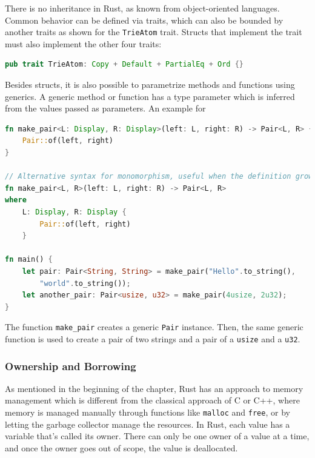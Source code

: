 \documentclass{article}
\begin{document}
There is no inheritance in Rust, as known from object-oriented languages. Common behavior can be defined via traits, which can also be bounded by another traits as shown for the \lstinline{TrieAtom} trait. Structs that implement the trait must also implement the other four traits:
\begin{lstlisting}[language=Rust, style=boxed, caption=An example trait from the \textit{trying} crate which we evaluate the approach on, label=lst:trying-trait-bounding]
pub trait TrieAtom: Copy + Default + PartialEq + Ord {}
\end{lstlisting}

Besides structs, it is also possible to parametrize methods and functions using generics. A generic method or function has a type parameter which is inferred from the values passed as parameters. An example for
\begin{lstlisting}[language=Rust, style=boxed, caption=Variants of defining a generic function, label=lst:function-monomorphization]
fn make_pair<L: Display, R: Display>(left: L, right: R) -> Pair<L, R> {
    Pair::of(left, right)
}

// Alternative syntax for monomorphism, useful when the definition grows large
fn make_pair<L, R>(left: L, right: R) -> Pair<L, R>
where
    L: Display, R: Display {
        Pair::of(left, right)
    }

fn main() {
    let pair: Pair<String, String> = make_pair("Hello".to_string(),
        "world".to_string());
    let another_pair: Pair<usize, u32> = make_pair(4usize, 2u32);
}
\end{lstlisting}

The function \lstinline{make_pair} creates a generic \lstinline{Pair} instance. Then, the same generic function is used to create a pair of two strings and a pair of a \lstinline{usize} and a \lstinline{u32}.

\subsubsection{Ownership and Borrowing}
As mentioned in the beginning of the chapter, Rust has an approach to memory management which is different from the classical approach of C or C++, where memory is managed manually through functions like \lstinline{malloc} and \lstinline{free}, or by letting the garbage collector manage the resources. In Rust, each value has a variable that's called its owner. There can only be one owner of a value at a time, and once the owner goes out of scope, the value is deallocated.
\end{document}
